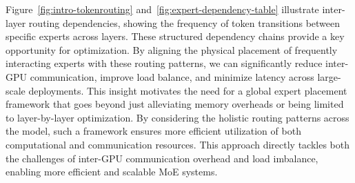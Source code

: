 Figure~\ref{fig:intro-tokenrouting} and~\ref{fig:expert-dependency-table} illustrate inter-layer routing dependencies, showing the frequency of token transitions between specific experts across layers.
% 
These structured dependency chains provide a key opportunity for optimization. By aligning the physical placement of frequently interacting experts with these routing patterns, we can significantly reduce inter-GPU communication, improve load balance, and minimize latency across large-scale deployments.
%
This insight motivates the need for a global expert placement framework that goes beyond just alleviating memory overheads or being limited to layer-by-layer optimization.
% 
By considering the holistic routing patterns across the model, such a framework ensures more efficient utilization of both computational and communication resources.
% 
This approach directly tackles both the challenges of inter-GPU communication overhead and load imbalance, enabling more efficient and scalable MoE systems.
